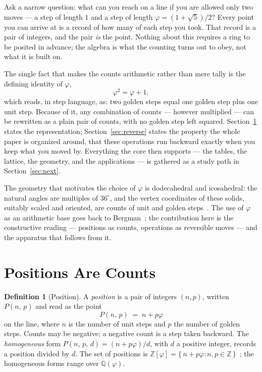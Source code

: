 \documentclass[11pt]{article}
\theoremstyle{definition}
\newtheorem{definition}[theorem]{Definition}
\theoremstyle{remark}
\newcommand{\Z}{\mathbb{Z}}
\newcommand{\Zphi}{\mathbb{Z}[\varphi]}
\newcommand{\Qphi}{\mathbb{Q}(\varphi)}
\newcommand{\Pb}[2]{P(#1,\,#2)}
\newcommand{\Pbd}[3]{P(#1,\,#2,\,#3)}
\begin{document}
Ask a narrow question: what can you reach on a line if you are allowed only two
moves --- a step of length $1$ and a step of length $\varphi=(1+\sqrt5)/2$? Every
point you can arrive at is a record of how many of each step you took. That
record is a pair of integers, and the pair \emph{is} the point. Nothing about
this requires a ring to be posited in advance; the algebra is what the counting
turns out to obey, not what it is built on.

The single fact that makes the counts arithmetic rather than mere tally is the
defining identity of $\varphi$,
\[
  \varphi^2 = \varphi + 1,
\]
which reads, in step language, as: two golden steps equal one golden step plus
one unit step. Because of it, any combination of counts --- however multiplied
--- can be rewritten as a plain pair of counts, with no golden step left
squared. Section~\ref{sec:counting} states the representation;
Section~\ref{sec:reverse} states the property the whole paper is organized
around, that these operations run backward exactly when you keep what you moved
by. Everything the core then supports --- the tables, the lattice, the geometry,
and the applications --- is gathered as a study path in
Section~\ref{sec:next}.

The geometry that motivates the choice of $\varphi$ is dodecahedral and
icosahedral: the natural angles are multiples of $36^\circ$, and the vertex
coordinates of these solids, suitably scaled and oriented, are counts of unit
and golden steps~\cite{coxeter,senechal}. The use of $\varphi$ as an arithmetic
base goes back to Bergman~\cite{bergman}; the contribution here is the
constructive reading --- positions as counts, operations as reversible moves ---
and the apparatus that follows from it.

\section{Positions Are Counts}
\label{sec:counting}

\begin{definition}[Position]
\label{def:position}
A \emph{position} is a pair of integers $(n,p)$, written $\Pb{n}{p}$ and read as
the point
\[
  \Pb{n}{p} \;=\; n + p\varphi
\]
on the line, where $n$ is the number of unit steps and $p$ the number of golden
steps. Counts may be negative; a negative count is a step taken backward. The
\emph{homogeneous} form $\Pbd{n}{p}{d}=(n+p\varphi)/d$, with $d$ a positive
integer, records a position divided by $d$. The set of positions is
$\Zphi=\{\,n+p\varphi : n,p\in\Z\,\}$~\cite{marcus}; the homogeneous forms
range over $\Qphi$.
\end{definition}
\end{document}

